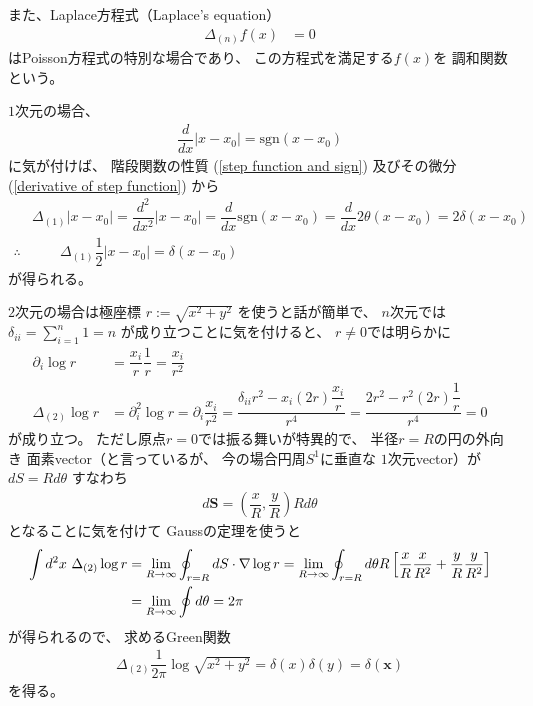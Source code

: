また、Laplace方程式（Laplace's equation）
\begin{align}
    \Delta_{(n)} f(x)
    &= 0
\label{laplace eq}
\end{align}
はPoisson方程式の特別な場合であり、
この方程式を満足する$f(x)$を
調和関数という。

$1$次元の場合、
\begin{align}
    \dfrac{d}{dx}
    |x - x_0|
=
    \mathrm{sgn}
    (x - x_0)
\end{align}
に気が付けば、
階段関数の性質
(\ref{step function and sign})
及びその微分
(\ref{derivative of step function})
から
\begin{subequations}
\begin{align}
    &
    \Delta_{(1)}
    |x - x_0|
=
    \dfrac{d^2}{dx^2}
    |x - x_0|
=
    \dfrac{d}{dx}
    \mathrm{sgn}
    (x - x_0)
=
    \dfrac{d}{dx}
    2 \theta (x - x_0)
=
    2 \delta (x - x_0)
\\\therefore
&\qquad
    \Delta_{(1)}
    \dfrac{1}{2}|x - x_0|
    =
    \delta (x - x_0)
\end{align}
\end{subequations}
が得られる。

$2$次元の場合は極座標
$r := \sqrt{x^2 + y^2}$
を使うと話が簡単で、
$n$次元では
$\displaystyle
\delta_{ii}
= \sum_{i=1}^n 1
= n$
が成り立つことに気を付けると、
$r \neq 0$では明らかに
\begin{subequations}
\begin{align}
    \partial_i
    \log r
&=
    \dfrac{x_i}{r}
    \dfrac{1}{r}
=
    \dfrac{x_i}{r^2}
\\
    \Delta_{(2)}
    \log r
&=
    \partial_i^2
    \log r
=
    \partial_i
    \dfrac{x_i}{r^2}
=
    \dfrac{
        \delta_{ii} r^2
    -
        x_i (2 r)
        \dfrac{x_i}{r}
    }{r^4}
=
    \dfrac{
        2 r^2
    -
        r^2 (2 r)
        \dfrac{1}{r}
    }{r^4}
= 0
\end{align}
\end{subequations}
が成り立つ。
ただし原点$r = 0$では振る舞いが特異的で、
半径$r = R$の円の外向き
面素vector（と言っているが、
今の場合円周$S^1$に垂直な
$1$次元vector）が
$dS = R d \theta$
すなわち
\begin{align}
    d \bm{S}
=
    \left(
        \dfrac{x}{R}
    ,
        \dfrac{y}{R}
    \right)
    R d \theta
\end{align}
となることに気を付けて
Gaussの定理を使うと
\begin{align}
    \int d^2 x\ 
        \Delta_{(2)}
        \log r
&=
    \lim_{R \to \infty}
    \oint_{r = R} d \bm{S}
        \cdot
        \nabla
        \log r
=
    \lim_{R \to \infty}
    \oint_{r = R}
        d \theta
    R
    \left[
        \dfrac{x}{R}
        \dfrac{x}{R^2}
    +
        \dfrac{y}{R}
        \dfrac{y}{R^2}
    \right]
\notag\\&
=
    \lim_{R \to \infty}
    \oint
        d \theta
=
    2 \pi
\end{align}
が得られるので、
求めるGreen関数
\begin{align}
    \Delta_{(2)}
    \dfrac{1}{2 \pi}
    \log \sqrt{x^2 + y^2}
=
    \delta(x)
    \delta(y)
=
    \delta(\bm{x})
\end{align}
を得る。

